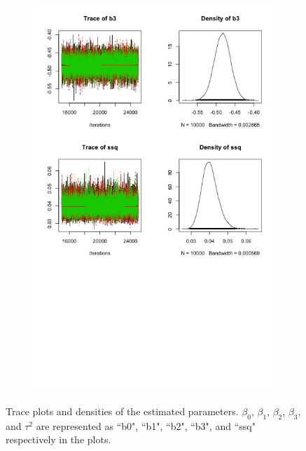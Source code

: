 \documentclass[12pt, a4paper]{article}
\begin{document}
\begin{figure}[H]
\begin{subfigure}{.5\textwidth}
\includegraphics[width=1\linewidth]{Afig2.jpeg}
\end{subfigure}
\caption{\small Trace plots and densities of the estimated parameters. $\beta_{0}$, $\beta_{1}$, $\beta_{2}$, $\beta_{3}$, and $\tau^{2}$ are represented as ``b0", ``b1", ``b2", ``b3", and ``ssq" respectively in the plots.}
\end{figure}
  
  

 
  
\end{document}
